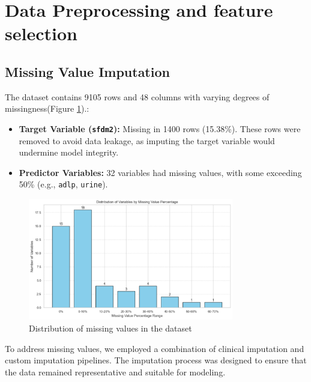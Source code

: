 \section{Data Preprocessing and feature selection}

\subsection{Missing Value Imputation}

The dataset contains 9105 rows and 48 columns with varying degrees of missingness(Figure \ref{fig:missing_distribution}).:

\begin{itemize}
    \item \textbf{Target Variable (\texttt{sfdm2}):} Missing in 1400 rows (15.38\%). These rows were removed to avoid data leakage, as imputing the target variable would undermine model integrity.
    \item \textbf{Predictor Variables:} 32 variables had missing values, with some exceeding 50\% (e.g., \texttt{adlp}, \texttt{urine}).
\end{itemize}

\begin{figure}[!h]
\centering
\includegraphics[width=0.8\textwidth]{../results/missing_distribution.png}
\caption{Distribution of missing values in the dataset}
\label{fig:missing_distribution}
\end{figure}

To address missing values, we employed a combination of clinical imputation and custom imputation pipelines. 
The imputation process was designed to ensure that the data remained representative and suitable for modeling.

